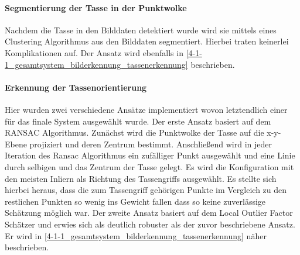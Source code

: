 \paragraph{Segmentierung der Tasse in der Punktwolke}
Nachdem die Tasse in den Bilddaten detektiert wurde wird sie mittels eines Clustering Algorithmus aus den Bilddaten segmentiert. Hierbei traten keinerlei Komplikationen auf. Der Ansatz wird ebenfalls in \ref{4-1-1_gesamtsystem_bilderkennung_tassenerkennung} beschrieben.

\paragraph{Erkennung der Tassenorientierung}
Hier wurden zwei verschiedene Ansätze implementiert wovon letztendlich einer für das finale System ausgewählt wurde. Der erste Ansatz basiert auf dem RANSAC Algorithmus. Zunächst wird die Punktwolke der Tasse auf die x-y-Ebene projiziert und deren Zentrum bestimmt. Anschließend wird in jeder Iteration des Ransac Algorithmus ein zufälliger Punkt ausgewählt und eine Linie durch selbigen und das Zentrum der Tasse gelegt. Es wird die Konfiguration mit den meisten Inliern als Richtung des Tassengriffs ausgewählt. Es stellte sich hierbei heraus, dass die zum Tassengriff gehörigen Punkte im Vergleich zu den restlichen Punkten so wenig ins Gewicht fallen dass so keine zuverlässige Schätzung möglich war.
Der zweite Ansatz basiert auf dem Local Outlier Factor Schätzer und erwies sich als deutlich robuster als der zuvor beschriebene Ansatz. Er wird in \ref{4-1-1_gesamtsystem_bilderkennung_tassenerkennung} näher beschrieben.